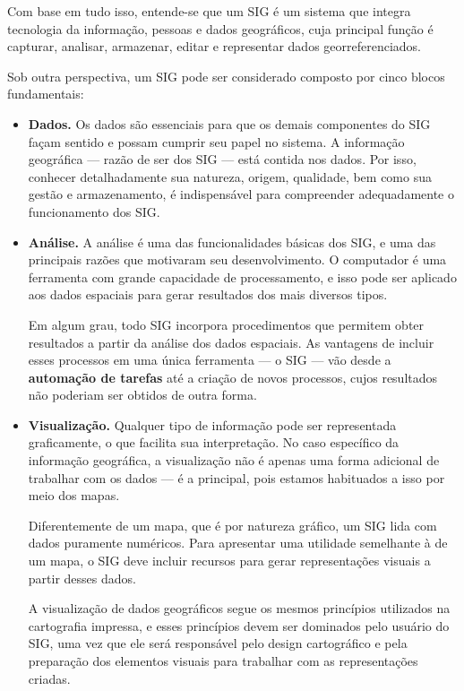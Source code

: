 Com base em tudo isso, entende-se que um SIG é um sistema que integra tecnologia da informação, pessoas e dados geográficos, cuja principal função é capturar, analisar, armazenar, editar e representar dados georreferenciados.

Sob outra perspectiva, um SIG pode ser considerado composto por cinco blocos fundamentais:

\begin{itemize}
 \item \textbf{Dados.} Os dados são essenciais para que os demais componentes do SIG façam sentido e possam cumprir seu papel no sistema. A informação geográfica — razão de ser dos SIG — está contida nos dados. Por isso, conhecer detalhadamente sua natureza, origem, qualidade, bem como sua gestão e armazenamento, é indispensável para compreender adequadamente o funcionamento dos SIG.

 \item \textbf{Análise.} A análise é uma das funcionalidades básicas dos SIG, e uma das principais razões que motivaram seu desenvolvimento. O computador é uma ferramenta com grande capacidade de processamento, e isso pode ser aplicado aos dados espaciais para gerar resultados dos mais diversos tipos.

 Em algum grau, todo SIG incorpora procedimentos que permitem obter resultados a partir da análise dos dados espaciais. As vantagens de incluir esses processos em uma única ferramenta — o SIG — vão desde a \textbf{automação de tarefas} até a criação de novos processos, cujos resultados não poderiam ser obtidos de outra forma.

 \item \textbf{Visualização.} Qualquer tipo de informação pode ser representada graficamente, o que facilita sua interpretação. No caso específico da informação geográfica, a visualização não é apenas uma forma adicional de trabalhar com os dados — é a principal, pois estamos habituados a isso por meio dos mapas.

 Diferentemente de um mapa, que é por natureza gráfico, um SIG lida com dados puramente numéricos. Para apresentar uma utilidade semelhante à de um mapa, o SIG deve incluir recursos para gerar representações visuais a partir desses dados.

 A visualização de dados geográficos segue os mesmos princípios utilizados na cartografia impressa, e esses princípios devem ser dominados pelo usuário do SIG, uma vez que ele será responsável pelo design cartográfico e pela preparação dos elementos visuais para trabalhar com as representações criadas.


\end{itemize}
